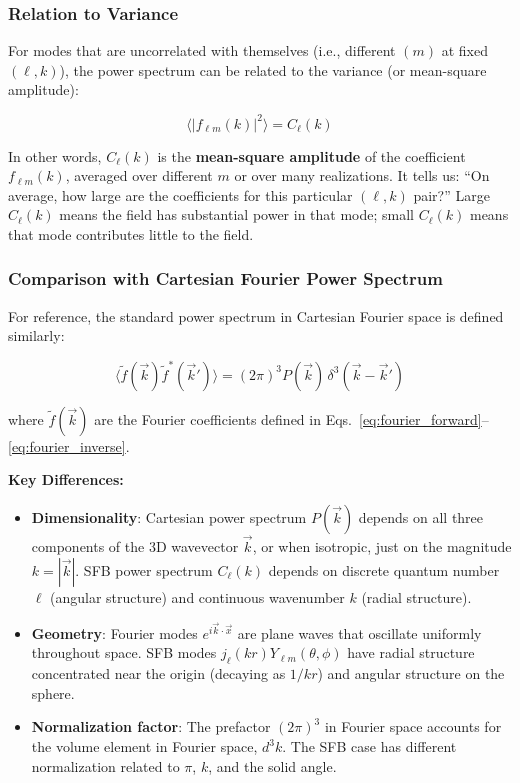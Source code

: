\subsubsection{Relation to Variance}

For modes that are uncorrelated with themselves (i.e., different $(m)$ at fixed $(\ell, k)$), the power spectrum can be related to the variance (or mean-square amplitude):

\begin{equation}
\langle |f_{\ell m}(k)|^2 \rangle = C_\ell(k)
\end{equation}

In other words, $C_\ell(k)$ is the \textbf{mean-square amplitude} of the coefficient $f_{\ell m}(k)$, averaged over different $m$ or over many realizations. It tells us: ``On average, how large are the coefficients for this particular $(\ell, k)$ pair?'' Large $C_\ell(k)$ means the field has substantial power in that mode; small $C_\ell(k)$ means that mode contributes little to the field.

\subsubsection{Comparison with Cartesian Fourier Power Spectrum}

For reference, the standard power spectrum in Cartesian Fourier space is defined similarly:

\begin{equation}
\langle \tilde{f}(\vec{k}) \tilde{f}^*(\vec{k}') \rangle = (2\pi)^3 P(\vec{k}) \, \delta^3(\vec{k} - \vec{k}')
\label{eq:fourier_ps_definition}
\end{equation}

where $\tilde{f}(\vec{k})$ are the Fourier coefficients defined in Eqs.~\eqref{eq:fourier_forward}--\eqref{eq:fourier_inverse}.

\textbf{Key Differences:}

\begin{itemize}
    \item \textbf{Dimensionality}: Cartesian power spectrum $P(\vec{k})$ depends on all three components of the 3D wavevector $\vec{k}$, or when isotropic, just on the magnitude $k = |\vec{k}|$. SFB power spectrum $C_\ell(k)$ depends on discrete quantum number $\ell$ (angular structure) and continuous wavenumber $k$ (radial structure).
    
    \item \textbf{Geometry}: Fourier modes $e^{i\vec{k}\cdot\vec{x}}$ are plane waves that oscillate uniformly throughout space. SFB modes $j_\ell(kr) Y_{\ell m}(\theta, \phi)$ have radial structure concentrated near the origin (decaying as $1/kr$) and angular structure on the sphere.
    
    \item \textbf{Normalization factor}: The prefactor $(2\pi)^3$ in Fourier space accounts for the volume element in Fourier space, $d^3k$. The SFB case has different normalization related to $\pi$, $k$, and the solid angle.
\end{itemize}

